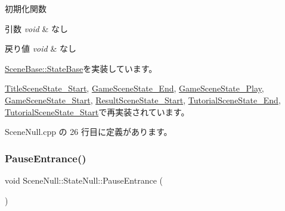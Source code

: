 初期化関数 


\begin{DoxyParams}{引数}
{\em void} & なし \\
\hline
\end{DoxyParams}

\begin{DoxyRetVals}{戻り値}
{\em void} & なし \\
\hline
\end{DoxyRetVals}


\mbox{\hyperlink{class_scene_base_1_1_state_base_a33350231b039a2178c19beac0211c5b8}{Scene\+Base\+::\+State\+Base}}を実装しています。



\mbox{\hyperlink{class_title_scene_state___start_a3e785ba088ac3fd0989fd657e5d0cd34}{Title\+Scene\+State\+\_\+\+Start}}, \mbox{\hyperlink{class_game_scene_state___end_a3b5c24eb6949215da331a20bdfbc55ae}{Game\+Scene\+State\+\_\+\+End}}, \mbox{\hyperlink{class_game_scene_state___play_a2637c407c8bbe0ef76b472c5b63e8057}{Game\+Scene\+State\+\_\+\+Play}}, \mbox{\hyperlink{class_game_scene_state___start_ae921c57f349fbb2f00a197d40a3404b7}{Game\+Scene\+State\+\_\+\+Start}}, \mbox{\hyperlink{class_result_scene_state___start_a615c7e05efd2320b8956c5fd94398f55}{Result\+Scene\+State\+\_\+\+Start}}, \mbox{\hyperlink{class_tutorial_scene_state___end_a572e5687140ff5ac43789f90462c05a5}{Tutorial\+Scene\+State\+\_\+\+End}}, \mbox{\hyperlink{class_tutorial_scene_state___start_acd4cd7e4efeebffa9616d7ca31c7b1c0}{Tutorial\+Scene\+State\+\_\+\+Start}}で再実装されています。



 Scene\+Null.\+cpp の 26 行目に定義があります。

\mbox{\label{class_scene_null_1_1_state_null_a0a14205bef6c8f73c3ef6b785b104f02}} 
\subsubsection{\texorpdfstring{Pause\+Entrance()}{PauseEntrance()}}
{\footnotesize\ttfamily void Scene\+Null\+::\+State\+Null\+::\+Pause\+Entrance (\begin{DoxyParamCaption}{ }\end{DoxyParamCaption})\hspace{0.3cm}{\ttfamily [virtual]}}



